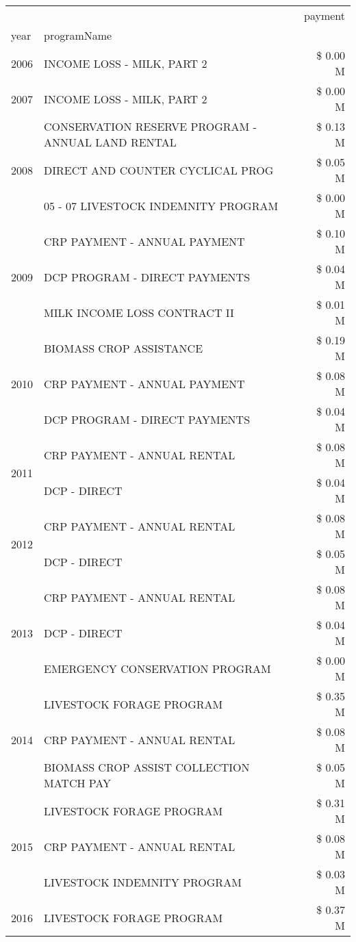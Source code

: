 \begin{tabular}{llr}
\toprule
 &  & payment \\
year & programName &  \\
\midrule
2006 & INCOME LOSS - MILK, PART 2 & \$ 0.00 M \\
\cline{1-3}
2007 & INCOME LOSS - MILK, PART 2 & \$ 0.00 M \\
\cline{1-3}
\multirow[t]{3}{*}{2008} & CONSERVATION RESERVE PROGRAM - ANNUAL LAND RENTAL & \$ 0.13 M \\
 & DIRECT AND COUNTER CYCLICAL PROG & \$ 0.05 M \\
 & 05 - 07 LIVESTOCK INDEMNITY PROGRAM & \$ 0.00 M \\
\cline{1-3}
\multirow[t]{3}{*}{2009} & CRP PAYMENT - ANNUAL PAYMENT & \$ 0.10 M \\
 & DCP PROGRAM - DIRECT PAYMENTS & \$ 0.04 M \\
 & MILK INCOME LOSS CONTRACT II & \$ 0.01 M \\
\cline{1-3}
\multirow[t]{3}{*}{2010} & BIOMASS CROP ASSISTANCE & \$ 0.19 M \\
 & CRP PAYMENT - ANNUAL PAYMENT & \$ 0.08 M \\
 & DCP PROGRAM - DIRECT PAYMENTS & \$ 0.04 M \\
\cline{1-3}
\multirow[t]{2}{*}{2011} & CRP PAYMENT - ANNUAL RENTAL & \$ 0.08 M \\
 & DCP - DIRECT & \$ 0.04 M \\
\cline{1-3}
\multirow[t]{2}{*}{2012} & CRP PAYMENT - ANNUAL RENTAL & \$ 0.08 M \\
 & DCP - DIRECT & \$ 0.05 M \\
\cline{1-3}
\multirow[t]{3}{*}{2013} & CRP PAYMENT - ANNUAL RENTAL & \$ 0.08 M \\
 & DCP - DIRECT & \$ 0.04 M \\
 & EMERGENCY CONSERVATION PROGRAM & \$ 0.00 M \\
\cline{1-3}
\multirow[t]{3}{*}{2014} & LIVESTOCK FORAGE PROGRAM & \$ 0.35 M \\
 & CRP PAYMENT - ANNUAL RENTAL & \$ 0.08 M \\
 & BIOMASS CROP ASSIST COLLECTION MATCH PAY & \$ 0.05 M \\
\cline{1-3}
\multirow[t]{3}{*}{2015} & LIVESTOCK FORAGE PROGRAM & \$ 0.31 M \\
 & CRP PAYMENT - ANNUAL RENTAL & \$ 0.08 M \\
 & LIVESTOCK INDEMNITY PROGRAM & \$ 0.03 M \\
\cline{1-3}
\multirow[t]{3}{*}{2016} & LIVESTOCK FORAGE PROGRAM & \$ 0.37 M \\

\end{tabular}
